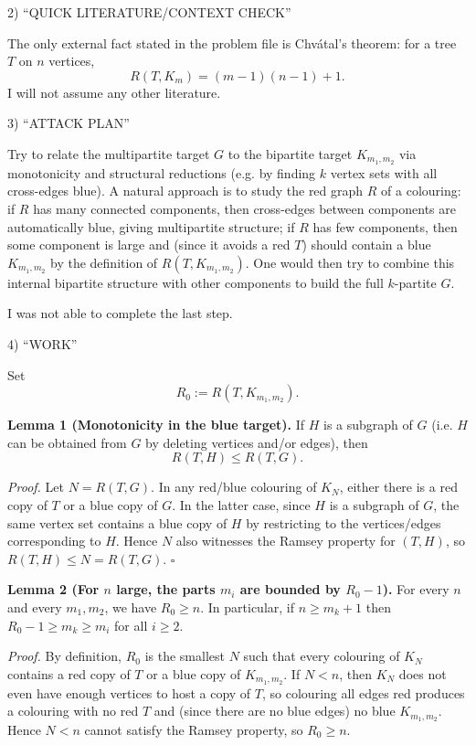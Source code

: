2) “QUICK LITERATURE/CONTEXT CHECK”

The only external fact stated in the problem file is Chv\'atal's theorem: for a tree $T$ on $n$ vertices,
\[
R(T,K_m)=(m-1)(n-1)+1.
\]
I will not assume any other literature.

3) “ATTACK PLAN”

Try to relate the multipartite target $G$ to the bipartite target $K_{m_1,m_2}$ via monotonicity and structural reductions (e.g. by finding $k$ vertex sets with all cross-edges blue). A natural approach is to study the red graph $R$ of a colouring: if $R$ has many connected components, then cross-edges between components are automatically blue, giving multipartite structure; if $R$ has few components, then some component is large and (since it avoids a red $T$) should contain a blue $K_{m_1,m_2}$ by the definition of $R(T,K_{m_1,m_2})$. One would then try to combine this internal bipartite structure with other components to build the full $k$-partite $G$.

I was not able to complete the last step.

4) “WORK”

Set
\[
R_0 := R(T,K_{m_1,m_2}).
\]

\textbf{Lemma 1 (Monotonicity in the blue target).}
If $H$ is a subgraph of $G$ (i.e. $H$ can be obtained from $G$ by deleting vertices and/or edges), then
\[
R(T,H)\le R(T,G).
\]

\emph{Proof.}
Let $N=R(T,G)$. In any red/blue colouring of $K_N$, either there is a red copy of $T$ or a blue copy of $G$. In the latter case, since $H$ is a subgraph of $G$, the same vertex set contains a blue copy of $H$ by restricting to the vertices/edges corresponding to $H$. Hence $N$ also witnesses the Ramsey property for $(T,H)$, so $R(T,H)\le N=R(T,G)$. $\square$

\textbf{Lemma 2 (For $n$ large, the parts $m_i$ are bounded by $R_0-1$).}
For every $n$ and every $m_1,m_2$, we have $R_0\ge n$. In particular, if $n\ge m_k+1$ then $R_0-1\ge m_k\ge m_i$ for all $i\ge 2$.

\emph{Proof.}
By definition, $R_0$ is the smallest $N$ such that every colouring of $K_N$ contains a red copy of $T$ or a blue copy of $K_{m_1,m_2}$. If $N<n$, then $K_N$ does not even have enough vertices to host a copy of $T$, so colouring all edges red produces a colouring with no red $T$ and (since there are no blue edges) no blue $K_{m_1,m_2}$. Hence $N<n$ cannot satisfy the Ramsey property, so $R_0\ge n$.

